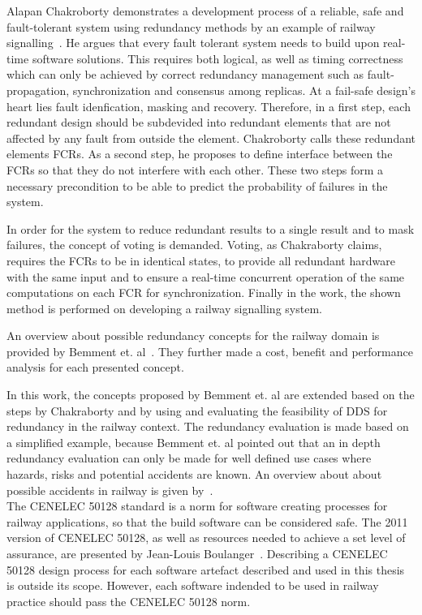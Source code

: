 Alapan Chakroborty demonstrates a development process of a reliable, safe and fault-tolerant system using redundancy methods by an example of railway signalling~\cite{ChakrabortyFaultTolerantRailway}.
He argues that every fault tolerant system needs to build upon real-time software solutions.
This requires both logical, as well as timing correctness which can only be achieved by correct redundancy management such as fault-propagation, synchronization and consensus among replicas.
At a fail-safe design's heart lies fault idenfication, masking and recovery.
Therefore, in a first step, each redundant design should be subdevided into redundant elements that are not affected by any fault from outside the element.
Chakroborty calls these redundant elements \glspl*{FCR}.
As a second step, he proposes to define interface between the \glspl*{FCR} so that they do not interfere with each other.
These two steps form a necessary precondition to be able to predict the probability of failures in the system.

In order for the system to reduce redundant results to a single result and to mask failures, the concept of voting is demanded.
Voting, as Chakraborty claims, requires the \glspl*{FCR} to be in identical states, to provide all redundant hardware with the same input and to ensure a real-time concurrent operation of the same computations on each \gls*{FCR} for synchronization.
Finally in the work, the shown method is performed on developing a railway signalling system.

An overview about possible redundancy concepts for the railway domain is provided by Bemment et. al~\cite{BemmentEvaluationOfRedundancy}.
They further made a cost, benefit and performance analysis for each presented concept.


In this work, the concepts proposed by Bemment et. al are extended based on the steps by Chakraborty and by using and evaluating the feasibility of \gls*{DDS} for redundancy in the railway context.
The redundancy evaluation is made based on a simplified example, because Bemment et. al pointed out that an in depth redundancy evaluation can only be made for well defined use cases where hazards, risks and potential accidents are known.
An overview about about possible accidents in railway is given by~\cite{ERTMSRailwayAccidents}.
\\

The CENELEC 50128 standard is a norm for software creating processes for railway applications, so that the build software can be considered safe.
The 2011 version of CENELEC 50128, as well as resources needed to achieve a set level of assurance, are presented by Jean-Louis Boulanger~\cite{BoulangerStandards}.
Describing a CENELEC 50128 design process for each software artefact described and used in this thesis is outside its scope.
However, each software indended to be used in railway practice should pass the CENELEC 50128 norm.
\\

